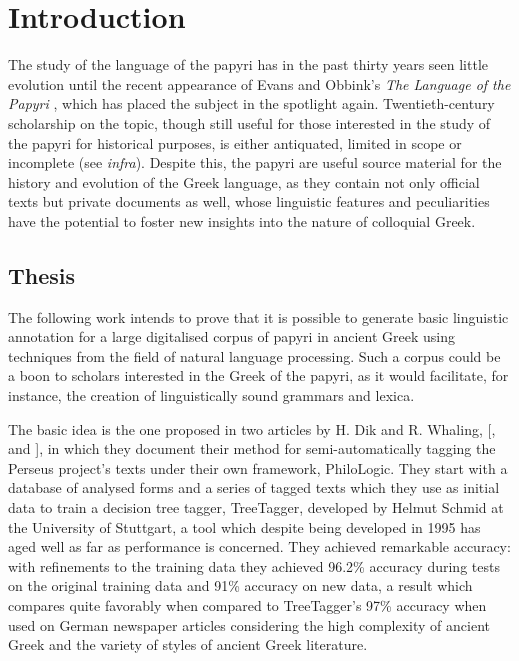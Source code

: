 \chapter{Introduction} 
\label{chp:introduction}

The study of the language of the papyri has in the past thirty years
seen little evolution until the recent appearance of Evans and Obbink's
\textit{The Language of the Papyri} \citep{lpapyri}, which has placed
the subject in the spotlight again. Twentieth-century scholarship on the
topic, though still useful for those interested in the study of the
papyri for historical purposes, is either antiquated, limited in scope
or incomplete (see \textit{infra}). Despite this, the papyri are
useful source material for the history and evolution of the Greek
language, as they contain not only official texts but private
documents as well, whose linguistic features and peculiarities have the
potential to foster new insights into the nature of colloquial Greek.

\section{Thesis}
The following work intends to prove that it is possible to generate
basic linguistic annotation for a large digitalised corpus of papyri
in ancient Greek using techniques from the field of natural language
processing.  Such a corpus could be a boon to scholars interested in
the Greek of the papyri, as it would facilitate, for instance, the
creation of linguistically sound grammars and lexica.

The basic idea is the one proposed in two articles by H. Dik and R.
Whaling, [\citeauthor{dik2008}, \citeyear{dik2008} and
\citeyear{dik2009}], in which they document their method for
semi-automatically tagging the Perseus project's texts under their own
framework, PhiloLogic. They start with a database of analysed forms
and a series of tagged texts which they use as initial data to train a
decision tree tagger, TreeTagger, developed by Helmut Schmid at the
University of Stuttgart, a tool which despite being developed in 1995
has aged well as far as performance is concerned. They achieved
remarkable accuracy: with refinements to the training data they
achieved 96.2\% accuracy during tests on the original training data
and 91\% accuracy on new data, a result which compares quite favorably
when compared to TreeTagger's 97\% accuracy when used on German
newspaper articles considering the high complexity of ancient Greek
and the variety of styles of ancient Greek literature.

